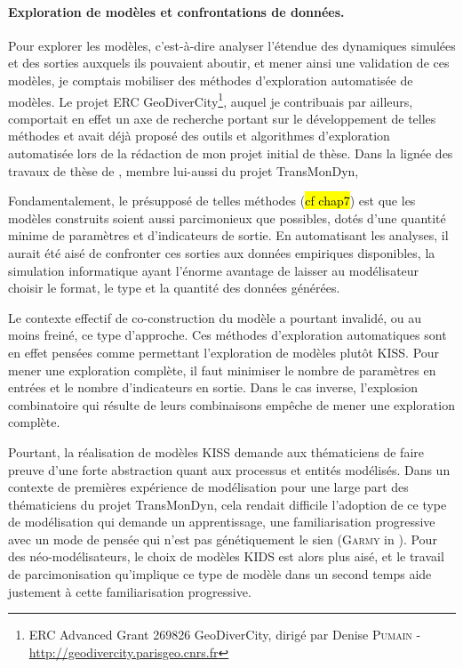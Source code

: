 \paragraph{Exploration de modèles et confrontations de données.}

Pour \og explorer les modèles\fg{}, c'est-à-dire analyser l'étendue des dynamiques simulées et des sorties auxquels ils pouvaient aboutir, et mener ainsi une validation de ces modèles, je comptais mobiliser des méthodes d'exploration automatisée de modèles.
Le projet ERC GeoDiverCity\footnote{
	ERC Advanced Grant 269826 GeoDiverCity, dirigé par Denise \textsc{Pumain} - \\ \href{http://geodivercity.parisgeo.cnrs.fr/blog/}{http://geodivercity.parisgeo.cnrs.fr}
}, auquel je contribuais par ailleurs, comportait en effet un axe de recherche portant sur le développement de telles méthodes et avait déjà proposé des outils et algorithmes d'exploration automatisée lors de la rédaction de mon projet initial de thèse.
Dans la lignée des travaux de thèse de \textcite{rey-coyrehourcq_plateforme_2015}, membre lui-aussi du projet TransMonDyn, 

Fondamentalement, le présupposé de telles méthodes (\hl{cf chap7}) est que les modèles construits soient aussi parcimonieux que possibles, dotés d'une quantité minime de paramètres et d'indicateurs de sortie.
En automatisant les analyses, il aurait été aisé de confronter ces sorties aux données empiriques disponibles, la simulation informatique ayant l'énorme avantage de laisser au modélisateur choisir le format, le type et la quantité des données générées.

Le contexte effectif de co-construction du modèle a pourtant invalidé, ou au moins freiné, ce type d'approche.
Ces méthodes d'exploration automatiques sont en effet pensées comme permettant l'exploration de modèles plutôt KISS.
Pour mener une exploration complète, il faut minimiser le nombre de paramètres en entrées et le nombre d'indicateurs en sortie.
Dans le cas inverse, l'\og explosion combinatoire\fg{} qui résulte de leurs combinaisons empêche de mener une exploration complète.

Pourtant, la réalisation de modèles KISS demande aux thématiciens de faire preuve d'une forte abstraction quant aux processus et entités modélisés.
Dans un contexte de premières expérience de modélisation pour une large part des thématiciens du projet TransMonDyn, cela rendait difficile l'adoption de ce type de modélisation qui demande \og un apprentissage, une familiarisation progressive avec un mode de pensée qui n'est pas génétiquement le sien\fg{} (\textsc{Garmy} in \cite[477]{ouriachi_lelaboration_2017}).
Pour des néo-modélisateurs, le choix de modèles KIDS est alors plus aisé, et le travail de \og parcimonisation\fg{} qu'implique ce type de modèle dans un second temps aide justement à cette \og familiarisation progressive\fg{}.

